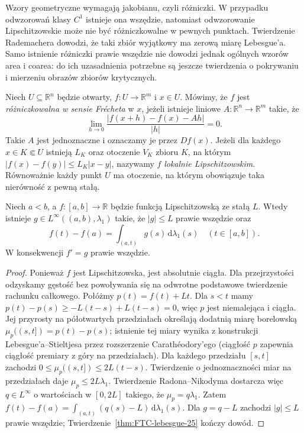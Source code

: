 Wzory geometryczne wymagają jakobianu, czyli różniczki. W przypadku
odwzorowań klasy $C^1$ istnieje ona wszędzie, natomiast odwzorowanie
Lipschitzowskie może nie być różniczkowalne w pewnych punktach.
Twierdzenie Rademachera dowodzi, że taki zbiór wyjątkowy ma zerową
miarę Lebesgue'a. Samo istnienie różniczki prawie wszędzie nie dowodzi
jednak ogólnych wzorów area i coarea: do ich uzasadnienia potrzebne są
jeszcze twierdzenia o pokrywaniu i mierzeniu obrazów zbiorów krytycznych.

\begin{definicja}
\label{def:frechet-rademacher-28}
Niech $U\subseteq\mathbb R^n$ będzie otwarty,
$f:U\to\mathbb R^m$ i $x\in U$. Mówimy, że $f$ jest
\emph{różniczkowalna w sensie Frécheta} w $x$, jeżeli istnieje
liniowe $A:\mathbb R^n\to\mathbb R^m$ takie, że
\[
 \lim_{h\to0}\frac{|f(x+h)-f(x)-Ah|}{|h|}=0.
\]
Takie $A$ jest jednoznaczne i oznaczamy je przez $Df(x)$.
Jeżeli dla każdego $x\in K\Subset U$ istnieją $L_K$ oraz
otoczenie $V_K$ zbioru $K$, na którym
$|f(x)-f(y)|\le L_K|x-y|$, nazywamy $f$
\emph{lokalnie Lipschitzowskim}. Równoważnie każdy punkt
$U$ ma otoczenie, na którym obowiązuje taka nierówność
z pewną stałą.
\end{definicja}

\begin{lemat}
\label{lem:rademacher-line-28}
Niech $a<b$, a $f:[a,b]\to\mathbb R$ będzie funkcją
Lipschitzowską ze stałą $L$. Wtedy istnieje
$g\in L^\infty((a,b),\lambda_1)$ takie, że
$|g|\le L$ prawie wszędzie oraz
\[
 f(t)-f(a)=\int_{(a,t)}g(s)\,\mathrm d\lambda_1(s)
 \quad (t\in[a,b]).
\]
W konsekwencji $f'=g$ prawie wszędzie.
\end{lemat}
\begin{proof}
Ponieważ $f$ jest Lipschitzowska, jest absolutnie ciągła.
Dla przejrzystości odzyskamy gęstość bez powoływania się na
odwrotne podstawowe twierdzenie rachunku całkowego.
Połóżmy $p(t)=f(t)+Lt$. Dla $s<t$ mamy
$p(t)-p(s)\ge -L(t-s)+L(t-s)=0$, więc $p$ jest
niemalejąca i ciągła. Jej przyrosty na półotwartych
przedziałach określają dodatnią miarę borelowską
$\mu_p((s,t])=p(t)-p(s)$; istnienie tej miary wynika
z konstrukcji Lebesgue'a--Stieltjesa przez rozszerzenie
Carathéodory'ego (ciągłość $p$ zapewnia ciągłość
premiary z góry na przedziałach). Dla każdego przedziału
$[s,t]$ zachodzi
$0\le\mu_p((s,t])\le2L(t-s)$.
Twierdzenie o jednoznaczności miar na przedziałach daje
$\mu_p\le2L\lambda_1$. Twierdzenie Radona--Nikodyma
dostarcza więc $q\in L^\infty$ o wartościach w $[0,2L]$
takiego, że $\mu_p=q\lambda_1$. Zatem
$f(t)-f(a)=\int_{(a,t)}(q(s)-L)\,\mathrm d\lambda_1(s)$.
Dla $g=q-L$ zachodzi $|g|\le L$ prawie wszędzie;
Twierdzenie~\ref{thm:FTC-lebesgue-25} kończy dowód.
\end{proof}

